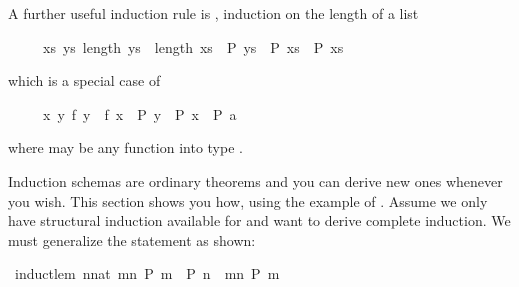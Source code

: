 \begin{isabellebody}
\begin{isamarkuptext}
A further useful induction rule is ,
induction on the length of a list
\begin{isabelle}%
\ \ \ \ \ {}{}xs{}\ {}ys{}\ length\ ys\ {}\ length\ xs\ {}\ P\ ys\ {}\ P\ xs{}\ {}\ P\ xs%
\end{isabelle}
which is a special case of 
\begin{isabelle}%
\ \ \ \ \ {}{}x{}\ {}y{}\ f\ y\ {}\ f\ x\ {}\ P\ y\ {}\ P\ x{}\ {}\ P\ a%
\end{isabelle}
where  may be any function into type .%
\end{isamarkuptext}%
\isamarkuptrue%
%
\isamarkuptrue%
%
\begin{isamarkuptext}%
\label{sec:derive-ind}
%
Induction schemas are ordinary theorems and you can derive new ones
whenever you wish.  This section shows you how, using the example
of . Assume we only have structural induction
available for  and want to derive complete induction.  We
must generalize the statement as shown:%
\end{isamarkuptext}%
\isamarkuptrue%
\isamarkupfalse%
\ induct{}lem{}\ {}{}{}n{}{}nat{}\ {}m{}n{}\ P\ m\ {}\ P\ n{}\ {}\ {}m{}n{}\ P\ m{}\isanewline

\end{isabellebody}

